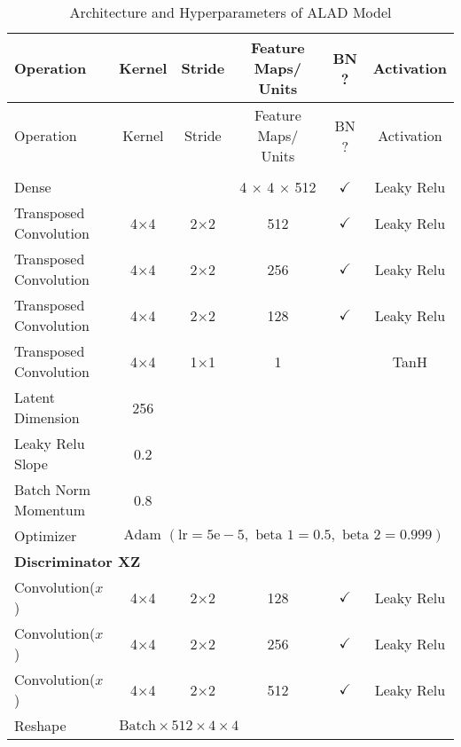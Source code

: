 \footnotesize
\begin{longtable}[c]{@{}lccccc@{}}
	\caption{Architecture and Hyperparameters of ALAD Model}
	\label{tab:alad_imp}\\
	\toprule
	Operation & Kernel & Stride & Feature Maps/ Units & BN ? & Activation \\* \midrule
	\endfirsthead
	\toprule
	Operation & Kernel & Stride & Feature Maps/ Units & BN ? & Activation \\* \midrule
	\endhead
	\bottomrule
	\endfoot
	\endlastfoot
	\multicolumn{6}{l}{\textbf{Generator}} \\
	Dense & \multicolumn{1}{c}{} &  & 4 $\times$ 4 $\times$ 512 & $\checkmark$ & Leaky Relu \\
	Transposed Convolution & \multicolumn{1}{c}{4$\times$4} & 2$\times$2 & 512 & $\checkmark$ & Leaky Relu \\
	Transposed Convolution & \multicolumn{1}{c}{4$\times$4} & 2$\times$2 & 256 & $\checkmark$ & Leaky Relu \\
	Transposed Convolution & \multicolumn{1}{c}{4$\times$4} & 2$\times$2 & 128 & $\checkmark$ & Leaky Relu \\
	Transposed Convolution & \multicolumn{1}{c}{4$\times$4} & 1$\times$1 & 1 &  & TanH \\ \hline
	Latent Dimension & 256 & \multicolumn{1}{l}{} & \multicolumn{1}{l}{} & \multicolumn{1}{l}{} & \multicolumn{1}{l}{} \\
	Leaky Relu Slope & 0.2 & \multicolumn{1}{l}{} & \multicolumn{1}{l}{} & \multicolumn{1}{l}{} & \multicolumn{1}{l}{} \\
	Batch Norm Momentum & 0.8 & \multicolumn{1}{l}{} & \multicolumn{1}{l}{} & \multicolumn{1}{l}{} & \multicolumn{1}{l}{} \\
	Optimizer & \multicolumn{5}{l}{$\text { Adam }(\mathrm{lr}=5 \mathrm{e}-5, \text { beta } 1=0.5, \text { beta } 2=0.999)$} \\ \hline
	\multicolumn{6}{l}{\textbf{Discriminator XZ}} \\
	Convolution($x$) & \multicolumn{1}{c}{4$\times$4} & 2$\times$2 & 128 & $\checkmark$ & Leaky Relu \\
	Convolution($x$) & \multicolumn{1}{c}{4$\times$4} & 2$\times$2 & 256 & $\checkmark$ & Leaky Relu \\
	Convolution($x$) & \multicolumn{1}{c}{4$\times$4} & 2$\times$2 & 512 & $\checkmark$ & Leaky Relu \\
	Reshape & \multicolumn{5}{l}{$\text{Batch} \times 512 \times 4 \times 4$} \\

\end{longtable}
